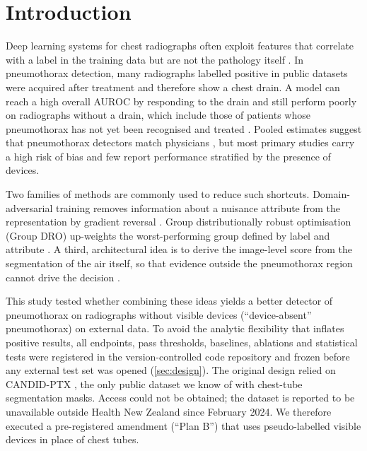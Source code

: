 \documentclass{ieeeaccess}
\begin{document}
\section{Introduction}
\label{sec:intro}

Deep learning systems for chest radiographs often exploit features that correlate with a label in the training data but are not the pathology itself \cite{geirhos2020shortcut,zech2018variable,degrave2021covid,badgeley2019hip,banerjee2023shortcuts}. In pneumothorax detection, many radiographs labelled positive in public datasets were acquired after treatment and therefore show a chest drain. A model can reach a high overall AUROC by responding to the drain and still perform poorly on radiographs without a drain, which include those of patients whose pneumothorax has not yet been recognised and treated \cite{oakdenrayner2020hidden,taylor2018pneumothorax,rueckel2020tubes}. Pooled estimates suggest that pneumothorax detectors match physicians \cite{sugibayashi2023meta,katzman2024meta}, but most primary studies carry a high risk of bias and few report performance stratified by the presence of devices.

Two families of methods are commonly used to reduce such shortcuts. Domain-adversarial training removes information about a nuisance attribute from the representation by gradient reversal \cite{ganin2015dann,kim2019learning,zhao2020confounder}. Group distributionally robust optimisation (Group DRO) up-weights the worst-performing group defined by label and attribute \cite{sagawa2020groupdro}. A third, architectural idea is to derive the image-level score from the segmentation of the air itself, so that evidence outside the pneumothorax region cannot drive the decision \cite{rueckel2021annotations}.

This study tested whether combining these ideas yields a better detector of pneumothorax on radiographs without visible devices (``device-absent'' pneumothorax) on external data. To avoid the analytic flexibility that inflates positive results, all endpoints, pass thresholds, baselines, ablations and statistical tests were registered in the version-controlled code repository and frozen before any external test set was opened \cite{nosek2018prereg} (\cref{sec:design}). The original design relied on CANDID-PTX \cite{feng2021candid}, the only public dataset we know of with chest-tube segmentation masks. Access could not be obtained; the dataset is reported to be unavailable outside Health New Zealand since February 2024. We therefore executed a pre-registered amendment (``Plan B'') that uses pseudo-labelled visible devices in place of chest tubes.
\end{document}

